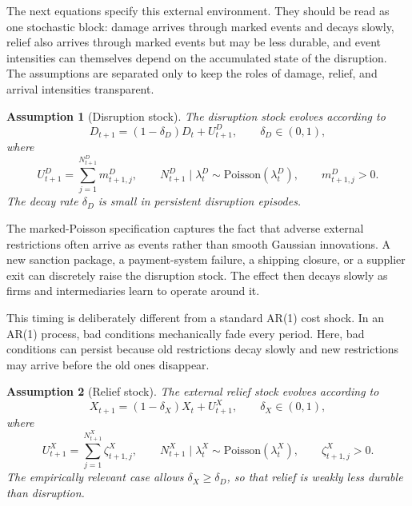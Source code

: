﻿\documentclass[12pt]{article}
\newtheorem{assumption}{Assumption}
\theoremstyle{remark}
\begin{document}
The next equations specify this external environment. They should be read as one stochastic block:
damage arrives through marked events and decays slowly, relief also arrives through marked events
but may be less durable, and event intensities can themselves depend on the accumulated state of
the disruption. The assumptions are separated only to keep the roles of damage, relief, and
arrival intensities transparent.

\begin{assumption}[Disruption stock]\label{ass:D_law}
The disruption stock evolves according to
\begin{equation}
    D_{t+1}
    =
    (1-\delta_D)D_t
    +
    U_{t+1}^D,
    \qquad
    \delta_D\in(0,1),
    \label{eq:D_law}
\end{equation}
where
\begin{equation}
    U_{t+1}^D
    =
    \sum_{j=1}^{N_{t+1}^D}m_{t+1,j}^D,
    \qquad
    N_{t+1}^D\mid\lambda_t^D
    \sim
    \mathrm{Poisson}(\lambda_t^D),
    \qquad
    m_{t+1,j}^D>0.
    \label{eq:D_marks}
\end{equation}
The decay rate $\delta_D$ is small in persistent disruption episodes.
\end{assumption}

The marked-Poisson specification captures the fact that adverse external restrictions often arrive
as events rather than smooth Gaussian innovations. A new sanction package, a payment-system
failure, a shipping closure, or a supplier exit can discretely raise the disruption stock. The
effect then decays slowly as firms and intermediaries learn to operate around it.

This timing is deliberately different from a standard AR(1) cost shock. In an AR(1) process, bad
conditions mechanically fade every period. Here, bad conditions can persist because old restrictions
decay slowly and new restrictions may arrive before the old ones disappear.

\begin{assumption}[Relief stock]\label{ass:X_law}
The external relief stock evolves according to
\begin{equation}
    X_{t+1}
    =
    (1-\delta_X)X_t
    +
    U_{t+1}^X,
    \qquad
    \delta_X\in(0,1),
    \label{eq:X_law}
\end{equation}
where
\begin{equation}
    U_{t+1}^X
    =
    \sum_{j=1}^{N_{t+1}^X}\zeta_{t+1,j}^X,
    \qquad
    N_{t+1}^X\mid\lambda_t^X
    \sim
    \mathrm{Poisson}(\lambda_t^X),
    \qquad
    \zeta_{t+1,j}^X>0.
    \label{eq:X_marks}
\end{equation}
The empirically relevant case allows $\delta_X\ge \delta_D$, so that relief is weakly less durable
than disruption.
\end{assumption}
\end{document}
